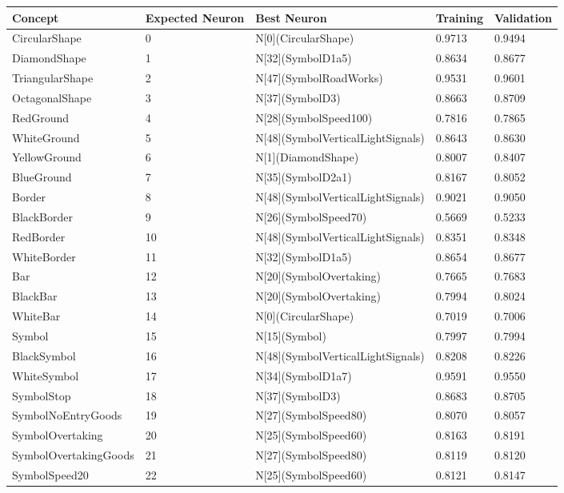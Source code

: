 \begin{table}[t]
\centering
\small
\begin{tabular}{lllll}
\toprule
Concept & Expected Neuron & Best Neuron & Training & Validation \\
\midrule
CircularShape & 0 & N[0](CircularShape) & 0.9713 & 0.9494 \\
DiamondShape & 1 & N[32](SymbolD1a5) & 0.8634 & 0.8677 \\
TriangularShape & 2 & N[47](SymbolRoadWorks) & 0.9531 & 0.9601 \\
OctagonalShape & 3 & N[37](SymbolD3) & 0.8663 & 0.8709 \\
RedGround & 4 & N[28](SymbolSpeed100) & 0.7816 & 0.7865 \\
WhiteGround & 5 & N[48](SymbolVerticalLightSignals) & 0.8643 & 0.8630 \\
YellowGround & 6 & N[1](DiamondShape) & 0.8007 & 0.8407 \\
BlueGround & 7 & N[35](SymbolD2a1) & 0.8167 & 0.8052 \\
Border & 8 & N[48](SymbolVerticalLightSignals) & 0.9021 & 0.9050 \\
BlackBorder & 9 & N[26](SymbolSpeed70) & 0.5669 & 0.5233 \\
RedBorder & 10 & N[48](SymbolVerticalLightSignals) & 0.8351 & 0.8348 \\
WhiteBorder & 11 & N[32](SymbolD1a5) & 0.8654 & 0.8677 \\
Bar & 12 & N[20](SymbolOvertaking) & 0.7665 & 0.7683 \\
BlackBar & 13 & N[20](SymbolOvertaking) & 0.7994 & 0.8024 \\
WhiteBar & 14 & N[0](CircularShape) & 0.7019 & 0.7006 \\
Symbol & 15 & N[15](Symbol) & 0.7997 & 0.7994 \\
BlackSymbol & 16 & N[48](SymbolVerticalLightSignals) & 0.8208 & 0.8226 \\
WhiteSymbol & 17 & N[34](SymbolD1a7) & 0.9591 & 0.9550 \\
SymbolStop & 18 & N[37](SymbolD3) & 0.8683 & 0.8705 \\
SymbolNoEntryGoods & 19 & N[27](SymbolSpeed80) & 0.8070 & 0.8057 \\
SymbolOvertaking & 20 & N[25](SymbolSpeed60) & 0.8163 & 0.8191 \\
SymbolOvertakingGoods & 21 & N[27](SymbolSpeed80) & 0.8119 & 0.8120 \\
SymbolSpeed20 & 22 & N[25](SymbolSpeed60) & 0.8121 & 0.8147 \\

\end{tabular}
\end{table}
